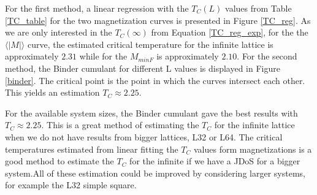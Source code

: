 	For the first method, a linear regression with the $T_C(L)$ values from Table \ref{TC_table} for the two magnetization curves is presented in Figure \ref{TC_reg}. As we are only interested in the $T_C(\infty)$ from Equation \ref{TC_reg_exp}, for the the $\langle |M| \rangle$ curve, the estimated critical temperature for the infinite lattice is approximately $2.31$ while for the $M_{minF}$ is approximately $2.10$. 
	For the second method, the Binder cumulant for different L values is displayed in Figure \ref{binder}. The critical point is the point in which the curves intersect each other. This yields an estimation $T_C \approx 2.25$.
	
	For the available system sizes, the Binder cumulant gave the best results with $T_C \approx 2.25$. This is a great method of estimating the $T_C$ for the infinite lattice when we do not have results from bigger lattices, L32 or L64. The critical temperatures estimated from linear fitting the $T_C$ values form magnetizations is a good method to estimate the $T_C$ for the infinite if we have a JDoS for a bigger system.All of these estimation could be improved by considering larger systems, for example the L32 simple square.








